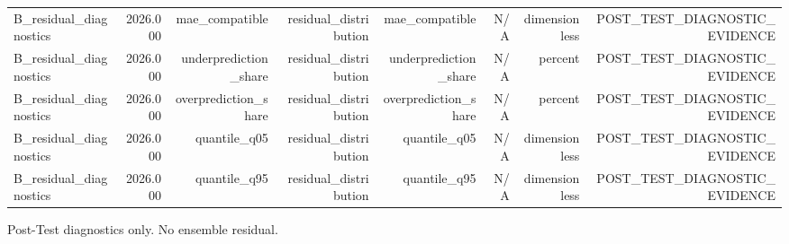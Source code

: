 \begin{table}[h!]
\begin{tabular}{lrrrrrrr}
B\_residual\_diagnostics & 2026.000 & mae\_compatible & residual\_distribution & mae\_compatible & N/A & dimensionless & POST\_TEST\_DIAGNOSTIC\_EVIDENCE \\
B\_residual\_diagnostics & 2026.000 & underprediction\_share & residual\_distribution & underprediction\_share & N/A & percent & POST\_TEST\_DIAGNOSTIC\_EVIDENCE \\
B\_residual\_diagnostics & 2026.000 & overprediction\_share & residual\_distribution & overprediction\_share & N/A & percent & POST\_TEST\_DIAGNOSTIC\_EVIDENCE \\
B\_residual\_diagnostics & 2026.000 & quantile\_q05 & residual\_distribution & quantile\_q05 & N/A & dimensionless & POST\_TEST\_DIAGNOSTIC\_EVIDENCE \\
B\_residual\_diagnostics & 2026.000 & quantile\_q95 & residual\_distribution & quantile\_q95 & N/A & dimensionless & POST\_TEST\_DIAGNOSTIC\_EVIDENCE \\
\bottomrule
\end{tabular}
\vspace{4pt}
\footnotesize{Post-Test diagnostics only. No ensemble residual.}\\
\end{table}
